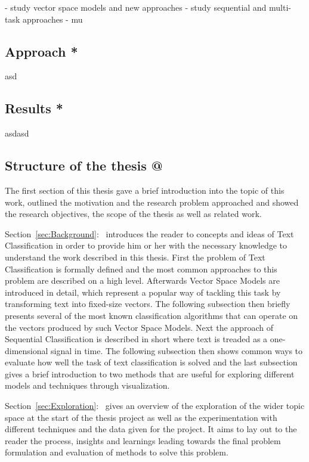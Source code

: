 - study vector space models and new approaches
- study sequential and multi-task approaches
- mu

\subsection{Approach *}

asd

\subsection{Results *}

asdasd

\subsection{Structure of the thesis @}

The first section of this thesis gave a brief introduction into the topic of this work, outlined the motivation and the research problem approached and showed the research objectives, the scope of the thesis as well as related work.

Section~\ref{sec:Background}:~ introduces the reader to concepts and ideas of Text Classification in order to provide him or her with the necessary knowledge to understand the work described in this thesis. First the problem of Text Classification is formally defined and the most common approaches to this problem are described on a high level. Afterwards Vector Space Models are introduced in detail, which represent a popular way of tackling this task by transforming text into fixed-size vectors.
The following subsection then briefly presents several of the most known classification algorithms that can operate on the vectors produced by such Vector Space Models. Next the approach of Sequential Classification is described in short where text is treaded as a one-dimensional signal in time. The following subsection then shows common ways to evaluate how well the task of text classification is solved and the last subsection gives a brief introduction to two methods that are useful for exploring different models and techniques through visualization.

Section~\ref{sec:Exploration}:~ gives an overview of the exploration of the wider topic space at the start of the thesis project as well as the experimentation with different techniques and the data given for the project. It aims to lay out to the reader the process, insights and learnings leading towards the final problem formulation and evaluation of methods to solve this problem.

